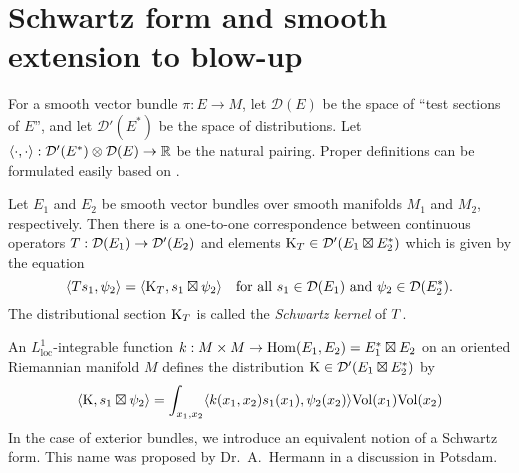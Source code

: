 \documentclass[\MainFolder/Text.tex]{subfiles}
\newcommand{\TestF}{\mathcal{D}}
\begin{document}
\section{Schwartz form and smooth extension to blow-up}\label{Sec:SchwFrom}
\allowdisplaybreaks

For a smooth vector bundle $\pi: E\rightarrow M$, let $\TestF(E)$ be the space of ``test sections of $E$'', and let $\TestF'(E^*)$ be the space of distributions.  Let $\langle\cdot,\cdot\rangle: \TestF'(E^*)\otimes\TestF(E)\rightarrow \R$ be the natural pairing. Proper definitions can be formulated easily based on \cite[Section~6]{HormanderI}.
\begin{Proposition}\label{Prop:SchwKer}
Let $E_1$ and $E_2$ be smooth vector bundles over smooth manifolds $M_1$ and $M_2$, respectively. Then there is a one-to-one correspondence between continuous operators $\TOp: \TestF(E_1)\rightarrow\TestF'(E_2)$ and elements $\KKer_\TOp\in\TestF'(E_1\boxtimes E_2^*)$ which is given by the equation
$$ \langle \TOp s_1, \psi_2 \rangle = \langle \KKer_\TOp, s_1 \boxtimes \psi_2 \rangle\quad\text{for all }s_1\in \TestF(E_1)\text{ and }\psi_2\in \TestF(E_2^*). $$
The distributional section $\mathrm{K}_{T}$ is called the \emph{Schwartz kernel} of $T$. 
\end{Proposition}

An $L^1_{\text{loc}}$-integrable function $k: M\times M \rightarrow \mathrm{Hom}(E_1,E_2)=E_1^*\boxtimes E_2$ on an oriented Riemannian manifold $M$ defines the distribution $\KKer\in \TestF'(E_1\boxtimes E_2^*)$ by
$$ \langle\mathrm{K},s_1\boxtimes \psi_2\rangle = \int_{x_1, x_2} \langle k(x_1,x_2)s_1(x_1),\psi_2(x_2)\rangle \mathrm{Vol}(x_1)\mathrm{Vol}(x_2) $$
In the case of exterior bundles, we introduce an equivalent notion of a Schwartz form. This name was proposed by Dr.~A.~Hermann in a discussion in Potsdam.
\end{document}
